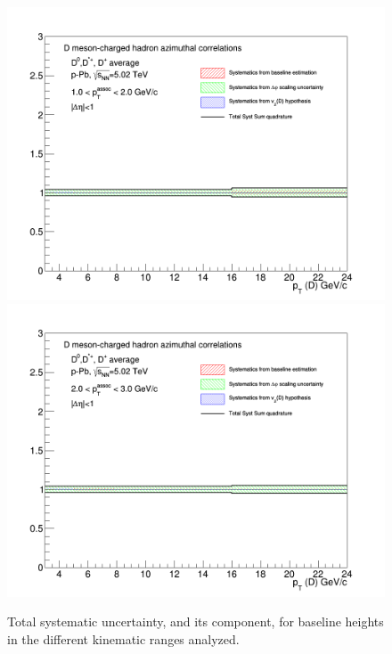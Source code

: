 \begin{figure}[!htbp]
{\includegraphics[width=0.49\linewidth, height=0.33\linewidth]{figures/FitOutput/TotalSystematicSourcesPedestal_pthad1dotto2dot.png}}
{\includegraphics[width=0.49\linewidth, height=0.33\linewidth]{figures/FitOutput/TotalSystematicSourcesPedestal_pthad2dotto3dot.png}}
\caption{Total systematic uncertainty, and its component, for baseline heights in the different kinematic ranges analyzed.}
\label{fig:baselineTotalUnc}
\end{figure}


